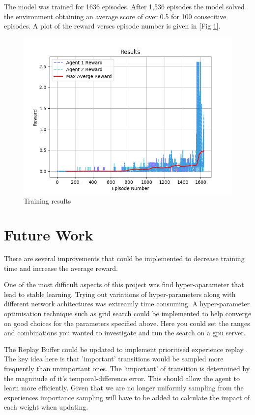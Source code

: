 \documentclass[12pt]{article}
\begin{document}
The model was trained for 1636 episodes. 
After 1,536 episodes the model solved the environment obtaining an average score of over 0.5 for 100 consecitive episodes.
A plot of the reward verses episode number is given in [Fig \ref{results}].

\begin{figure}
	\centering
	\includegraphics[width=0.8\linewidth]{./img/Results.png}
	\caption{Training results}
	\label{results}
\end{figure}


\section{Future Work}
There are several improvements that could be implemented to decrease training time and increase the average reward.

One of the most difficult aspects of this project was find hyper-aparameter that lead to stable learning.
Trying out variations of hyper-parameters along with different network achitectures was extreamly time consuming.
A hyper-parameter optimisation technique such as grid search could be implemented to help converge on good choices for the parameters 
specified above. 
Here you could set the ranges and combinations you wanted to investigate and run the search on a gpu server.

The Replay Buffer could be updated to implement prioritised experience replay \cite{per_paper}. 
The key idea here is that 'important' transitions would be sampled more frequently than unimportant ones. 
The 'important' of transition is determined by the magnitude of it's temporal-difference error.
This should allow the agent to learn more efficiently. 
Given that we are no longer uniformly sampling from the experiences importance sampling will have to be added to calculate the impact of each weight when updating.

\printbibliography
\end{document}
